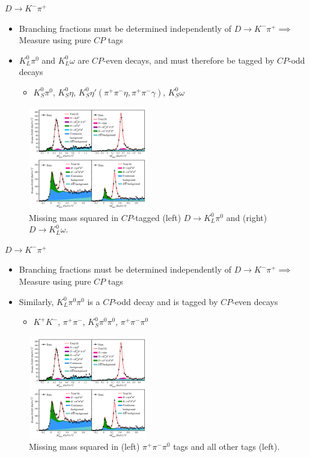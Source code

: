 \documentclass{beamer}
\begin{document}
\begin{frame}{$D\to K^-\pi^+$}
  \begin{itemize}
    \item{Branching fractions must be determined independently of $D\to K^-\pi^+\implies$ Measure using pure $C\!P$ tags}
    \item{$K_L^0\pi^0$ and $K_L^0\omega$ are $C\!P$-even decays, and must therefore be tagged by $C\!P$-odd decays}
    \begin{itemize}
      \item{$K_S^0\pi^0$, $K_S^0\eta$, $K_S^0\eta'(\pi^+\pi^-\eta, \pi^+\pi^-\gamma)$, $K_S^0\omega$}
    \end{itemize}
  \end{itemize}
  \begin{figure}
    \includegraphics[height=4.5cm,trim={0 8.5cm 0 0},clip=true]{Figures/Delta_Kpi_KLX_DT_Fits.pdf}
    \caption*{Missing mass squared in $C\!P$-tagged (left) $D\to K_L^0\pi^0$ and (right) $D\to K_L^0\omega$.}
  \end{figure}
\end{frame}

\begin{frame}{$D\to K^-\pi^+$}
  \begin{itemize}
    \item{Branching fractions must be determined independently of $D\to K^-\pi^+\implies$ Measure using pure $C\!P$ tags}
    \item{Similarly, $K_L^0\pi^0\pi^0$ is a $C\!P$-odd decay and is tagged by $C\!P$-even decays}
    \begin{itemize}
      \item{$K^+K^-$, $\pi^+\pi^-$, $K_S^0\pi^0\pi^0$, $\pi^+\pi^-\pi^0$}
    \end{itemize}
  \end{itemize}
  \begin{figure}
    \includegraphics[height=4.5cm,trim={0 0 0 8.8cm},clip=true]{Figures/Delta_Kpi_KLX_DT_Fits.pdf}
    \caption*{Missing mass squared in (left) $\pi^+\pi^-\pi^0$ tags and all other tags (left).}
  \end{figure}
\end{frame}
\end{document}

